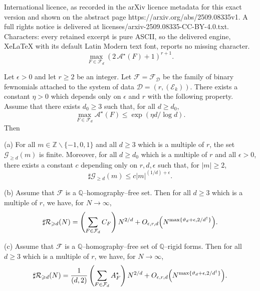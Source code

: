 \documentclass[10pt,a4paper]{amsart}
\newcommand {\Q}{{\mathbb{Q}}}
\newcommand {\Z}{{\mathbb{Z}}}
\newcommand{\calA}{\mathcal {A}}
\newcommand{\calF}{\mathcal {F}}
\newcommand{\calG}{\mathcal {G}}
\newcommand{\calR}{\mathcal {R}}
\begin{document}
International licence, as recorded in the arXiv licence metadata for this exact version and shown on the abstract page https://arxiv.org/abs/2509.08335v1. A full rights notice is delivered at licenses/arxiv-2509.08335-CC-BY-4.0.txt. Characters: every retained excerpt is pure ASCII, so the delivered engine, XeLaTeX with its default Latin Modern text font, reports no missing character.
 \begin{equation}\label{Equation:New1}
 \max_{F\in \mathcal F_d}
\left(2\, \calA ^\star(F)+1\right)^{r+1}.
\end{equation}

 \begin{theorem} \label{Th:principal}
Let $\epsilon>0$ and let $r\geqslant 2$ be an integer. Let $\mathcal F= \mathcal F_{\boldsymbol{ \mathcal D}}$ be the family of binary fewnomials attached to the system 
of data ${\boldsymbol{ \mathcal D}} =(r, (\mathcal E_k))$. 
There exists a constant $\eta>0$ which depends only on $\epsilon$ and $r$ with the following property. 
Assume that there exists $d_0\geqslant 3$ such that, for all $d\geqslant d_0$,
\begin{equation}\label{Equation:majorationCalAeta}
\max_{F\in\calF_d}\calA^\star(F)\leqslant \exp(\eta d/\log d).
\end{equation}
Then 
 
(a) For all $m\in\Z\smallsetminus\{-1,0,1\}$ and all $d\geqslant 3$ which is a multiple of $r$, the set $\calG_{\geqslant d}(m)$ is finite. Moreover, for all $d\geqslant d_0$ which is a multiple of $r$ and all $\epsilon>0$, there exists a constant $c$ depending only on $r,d,\epsilon$ such that, for $|m|\geqslant 2$,
\[
\sharp \calG_{\geqslant d}(m)\leqslant c |m|^{(1/d)+\epsilon }.
\]

(b) 
Assume that $\mathcal F$ is a $\Q$--homography--free set. Then 
for all $d\geqslant 3$ which is a multiple of $r$, we have, for $N\to\infty$,
\begin{equation}\label{Equation:calRdN}
\sharp \calR_{\geqslant d}(N)=
\left(\sum_{F\in\calF_d} C_F\right) N^{2/d}+ O_{\epsilon,r,d} \Bigl(N^{\max\{\vartheta_{d}+\epsilon,2/d^\dag\}} \Bigr).
\end{equation}

(c) 
Assume that $\mathcal F$ is a $\Q$--homography--free set of $\Q$--rigid forms. Then 
for all $d\geqslant 3$ which is a multiple of $r$, we have, for $N\to\infty$,
\[
\sharp \calR_{\geqslant d}(N)= \frac 1{(d,2)}
\left(\sum_{F\in\calF_d} A^\star_F\right) N^{2/d}+ O_{\epsilon,r,d} \Bigl(N^{\max\{\vartheta_{d}+\epsilon,2/d^\dag\}} \Bigr).
\]
\end{theorem}
\end{document}

